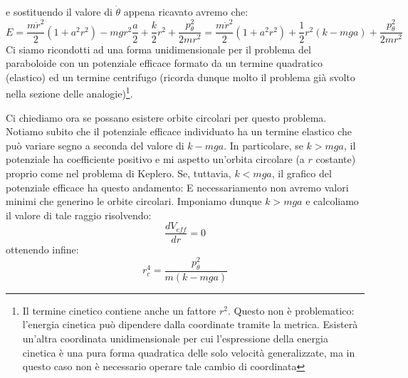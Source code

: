 \documentclass[a4paper,openany]{article}
\begin{document}
	e sostituendo il valore di $\dot{\theta}$ appena ricavato avremo che:
	$$
	E = \dfrac{m\dot{r}^{2}}{2}(1+a^{2}r^{2})- mgr^{2}\dfrac{a}{2} +  \dfrac{k}{2}r^{2} + \dfrac{p_{\theta}^{2}}{2mr^{2}} = \dfrac{m\dot{r}^{2}}{2}(1+a^{2}r^{2})+ \dfrac{1}{2}r^{2}( k-mga) + \dfrac{p_{\theta}^{2}}{2mr^{2}}
	$$
	Ci siamo ricondotti ad una forma unidimensionale per il problema del paraboloide con un potenziale efficace formato da un termine quadratico (elastico) ed un termine centrifugo (ricorda dunque molto il problema già svolto nella sezione delle analogie)\footnote{Il termine cinetico contiene anche un fattore $r^2$. Questo non è problematico: l'energia cinetica può dipendere dalla coordinate tramite la metrica. Esisterà un'altra coordinata unidimensionale per cui l'espressione della energia cinetica è una pura forma quadratica delle solo velocità generalizzate, ma in questo caso non è necessario operare tale cambio di coordinata}.
	
	Ci chiediamo ora se possano esistere orbite circolari per questo problema. Notiamo subito che il potenziale efficace individuato ha un termine elastico che può variare segno a seconda del valore di $k-mga$. In particolare, se $k> mga$, il potenziale ha coefficiente positivo e mi aspetto un'orbita circolare (a $r$ costante) proprio come nel problema di Keplero. Se, tuttavia, $k<mga$, il grafico del potenziale efficace ha questo andamento:
	E necessariamento non avremo valori minimi che generino le orbite circolari. Imponiamo dunque $k>mga$ e calcoliamo il valore di tale raggio risolvendo:
	$$
	\dfrac{dV_{eff}}{dr} = 0
	$$
	ottenendo infine:
	$$
	r^{4}_{c} = \dfrac{p_{\theta}^{2}}{m(k-mga)}
	$$
	
\end{document}
